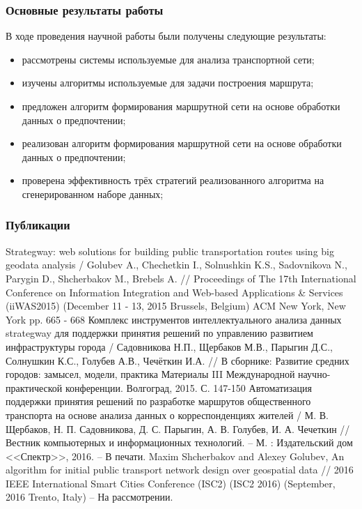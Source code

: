 \begin{frame}
    \frametitle{Основные результаты работы}
    В ходе проведения научной работы были получены следующие результаты:
    \begin{itemize}
        \item рассмотрены системы используемые для анализа транспортной сети;
        \item изучены алгоритмы используемые для задачи построения маршрута;
        \item предложен алгоритм формирования маршрутной сети на основе обработки данных о предпочтении;
        \item реализован алгоритм формирования маршрутной сети на основе обработки данных о предпочтении;
        \item проверена эффективность трёх стратегий реализованного алгоритма на сгенерированном наборе 
            данных;
    \end{itemize}
\end{frame}

\begin{frame}
    \frametitle{Публикации}
    \scriptsize
    \begin{thebibliography}{10}
         Strategway: web solutions for building public transportation routes using big geodata 
            analysis / Golubev A., Chechetkin I., Solnushkin K.S., Sadovnikova N., Parygin D., Shcherbakov M., 
            Brebels A. // Proceedings of The 17th International Conference on Information Integration and 
            Web-based Applications \& Services (iiWAS2015) (December 11 - 13, 2015 Brussels, Belgium) 
            ACM New York, New York pp. 665 - 668
         Комплекс инструментов интеллектуального анализа данных strategway для поддержки 
            принятия решений по управлению развитием инфраструктуры города / Садовникова Н.П., Щербаков М.В., 
            Парыгин Д.С., Солнушкин К.С., Голубев А.В., Чечёткин И.А. // В сборнике: Развитие средних 
            городов: замысел, модели, практика Материалы III Международной научно-практической конференции. 
            Волгоград, 2015. С. 147-150
         Автоматизация поддержки принятия решений по разработке маршрутов общественного 
            транспорта на основе анализа данных о корреспонденциях жителей / М. В. Щербаков, 
            Н. П. Садовникова, Д. С. Парыгин, А. В. Голубев, И. А. Чечеткин // Вестник компьютерных и 
            информационных технологий. -- М. : Издательский дом <<Спектр>>, 2016. -- В печати.
         Maxim Shcherbakov and Alexey Golubev, An algorithm for initial public transport 
            network design over geospatial data // 2016 IEEE International Smart Cities Conference (ISC2) 
            (ISC2 2016) (September, 2016 Trento, Italy) -- На рассмотрении.
    \end{thebibliography}
\end{frame}

